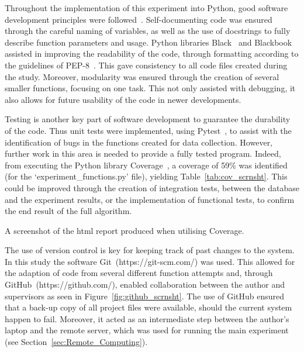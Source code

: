 Throughout the implementation of this experiment into Python, good software
development principles were followed~\cite{Jimenez2017, Sandve2013, Wilson2014}. Self-documenting code was 
ensured through the careful naming of variables, as well as the use of 
docstrings to fully describe function parameters and usage. Python libraries 
Black~\cite{Langa2019} and Blackbook~\cite{Knight2019a} assisted in improving the readability of the code, through 
formatting according to the guidelines of PEP-8~\cite{Rossum2001}. This gave consistency to all 
code files created during the study. Moreover, modularity was ensured through the creation of several 
smaller functions, focusing on one task. This not only assisted with debugging,
it also allows for future usability of the code in newer developments.

Testing is another key part of software development to guarantee the durability of 
the code. Thus unit tests were implemented, using Pytest~\cite{pytestx.y}, to
assist with the 
identification of bugs in the functions created for data collection. However, 
further work in this area is needed to provide a fully tested program. 
Indeed, from executing the Python library Coverage~\cite{Batchelder2020}, a
coverage of 59\% was identified (for the `experiment\_functions.py' file), 
yielding Table~\ref{tab:cov_scrnsht}. This could be improved through the creation of 
integration tests, between the database and the experiment results, or the 
implementation of functional tests, to confirm the end result of the full 
algorithm.

\begin{table}
    \centering
    \resizebox{\textwidth}{!}{}
    \caption{A screenshot of the html report produced when utilising Coverage.}\label{tab:cov_scrnsht}
\end{table}

The use of version control is key for keeping track of past changes 
to the system. In this study the software Git~(https://git-scm.com/) was used. This allowed for the 
adaption of code from several different function attempts and, through GitHub~(https://github.com/), 
enabled collaboration between the author and supervisors as seen
in Figure~\ref{fig:github_scrnsht}. The use of GitHub ensured that a back-up copy
of all project files 
were available, should the current system happen to fail. Moreover, it acted as
an intermediate step between the author's laptop and the remote server, which
was used for
running the main experiment (see Section~\ref{sec:Remote_Computing}).

